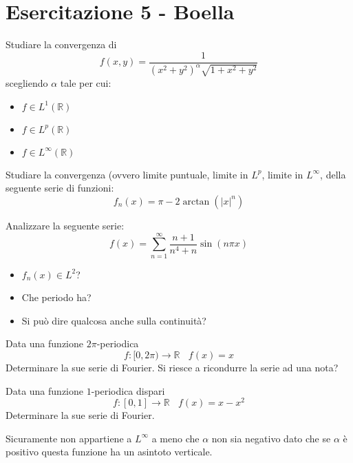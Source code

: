 \chapter{Esercitazione 5 - Boella}
\ParteEsercizi
\Esercizio{}

Studiare la convergenza di
\begin{equation*}
f( x,y) =\frac{1}{(x^{2} +y^{2} )^{\alpha }\sqrt{1+x^{2} +y^{2}}}
\end{equation*}
scegliendo $\alpha $ tale per cui:
\begin{itemize}
\item $f\in L^{1} (\mathbb{R} )$
\item $f\in L^{p} (\mathbb{R} )$
\item $f\in L^{\infty } (\mathbb{R} )$
\end{itemize}
\Esercizio{}

Studiare la convergenza (ovvero limite puntuale, limite in $L^{p}$, limite in $L^{\infty }$, della seguente serie di funzioni:
\begin{equation*}
f_{n} (x)=\pi -2\arctan (|x|^{n} )
\end{equation*}
\Esercizio{}

Analizzare la seguente serie:
\begin{equation*}
f(x)=\sum ^{\infty }_{n=1}\frac{n+1}{n^{4} +n}\sin (n\pi x)
\end{equation*}
\begin{itemize}
\item $f_{n} (x)\in L^{2}$?
\item Che periodo ha?
\item Si può dire qualcosa anche sulla continuità?
\end{itemize}
\Esercizio{}

Data una funzione $2\pi $-periodica
\begin{equation*}
f:[ 0,2\pi )\rightarrow \mathbb{R} \ \ \ \ f(x)=x
\end{equation*}
Determinare la sue serie di Fourier. Si riesce a ricondurre la serie ad una nota?
\Esercizio{}

Data una funzione $1$-periodica dispari
\begin{equation*}
f:[ 0,1]\rightarrow \mathbb{R} \ \ \ \ f(x)=x-x^{2}
\end{equation*}
Determinare la sue serie di Fourier.
\ParteSoluzioni
\Soluzione

Sicuramente non appartiene a $L^{\infty }$ a meno che $\alpha $ non sia negativo dato che se $\alpha $ è positivo questa funzione ha un asintoto verticale.

